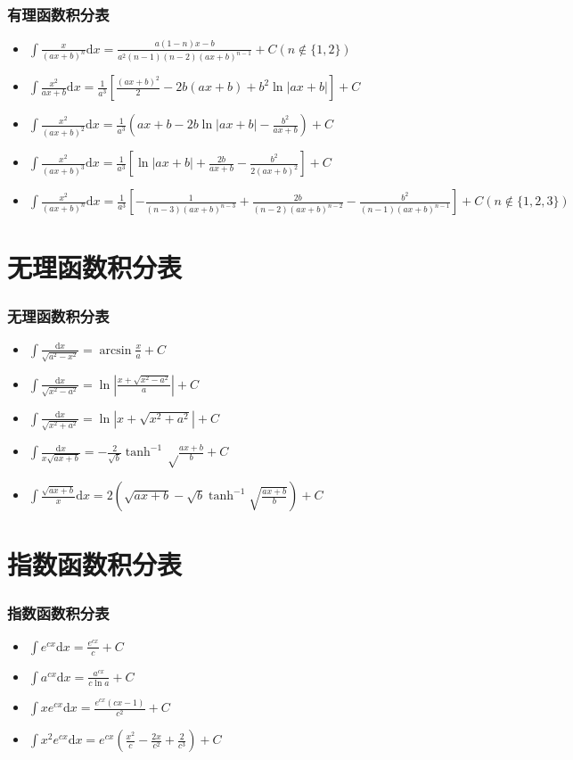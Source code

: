 \documentclass[UTF8, aspectratio = 169, fontsize = 12, hyperref]{ctexbeamer}
\begin{document}
    \begin{frame}
        \frametitle{有理函数积分表}
        \begin{itemize}
            \item $\int{\frac{x}{(ax+b)^n}}\mathrm{d}x=\frac{a(1-n)x-b}{a^2(n-1)(n-2)(ax+b)^{n-1}}+C (n \notin \{1,2\})$
            \item $\int{\frac{x^2}{ax+b}}\mathrm{d}x=\frac{1}{a^3}[\frac{(ax+b)^2}{2}-2b(ax+b)+b^2\ln{|ax+b|}]+C$
            \item $\int{\frac{x^2}{(ax+b)^2}}\mathrm{d}x=\frac{1}{a^3}(ax+b-2b\ln{|ax+b|}-\frac{b^2}{ax+b})+C$
            \item $\int{\frac{x^2}{(ax+b)^3}}\mathrm{d}x=\frac{1}{a^3}[\ln{|ax+b|}+\frac{2b}{ax+b}-\frac{b^2}{2(ax+b)^2}]+C$
            \item $\int{\frac{x^2}{(ax+b)^n}}\mathrm{d}x=\frac{1}{a^3}[-\frac{1}{(n-3)(ax+b)^{n-3}}+\frac{2b}{(n-2)(ax+b)^{n-2}}-\frac{b^2}{(n-1)(ax+b)^{n-1}}]+C (n \notin \{1,2,3\})$
        \end{itemize}
    \end{frame}
    \section{无理函数积分表}
    \begin{frame}
        \frametitle{无理函数积分表}
        \begin{itemize}
            \item $\int{\frac{\mathrm{d}x}{\sqrt{a^2-x^2}}}=\arcsin{\frac{x}{a}}+C$
            \item $\int{\frac{\mathrm{d}x}{\sqrt{x^2-a^2}}}=\ln{|\frac{x+\sqrt{x^2-a^2}}{a}|}+C$
            \item $\int{\frac{\mathrm{d}x}{\sqrt{x^2+a^2}}}=\ln{|x+\sqrt{x^2+a^2}|}+C$
            \item $\int{\frac{\mathrm{d}x}{x\sqrt{ax+b}}}=-\frac{2}{\sqrt{b}}\tanh^{-1}{\sqrt\frac{ax+b}{b}}+C$
            \item $\int{\frac{\sqrt{ax+b}}{x}}\mathrm{d}x=2(\sqrt{ax+b}-\sqrt{b}\tanh^{-1}\sqrt{\frac{ax+b}{b}})+C$
        \end{itemize}
    \end{frame}
    \section{指数函数积分表}
    \begin{frame}
        \frametitle{指数函数积分表}
        \begin{itemize}
            \item $\int{e^{cx}}\mathrm{d}x=\frac{e^{cx}}{c}+C$
            \item $\int{a^{cx}}\mathrm{d}x=\frac{a^{cx}}{c\ln{a}}+C$
            \item $\int{xe^{cx}}\mathrm{d}x=\frac{e^{cx}(cx-1)}{c^2}+C$
            \item $\int{x^2e^{cx}}\mathrm{d}x=e^{cx}(\frac{x^2}{c}-\frac{2x}{c^2}+\frac{2}{c^3})+C$
        \end{itemize}
    \end{frame}
\end{document}
